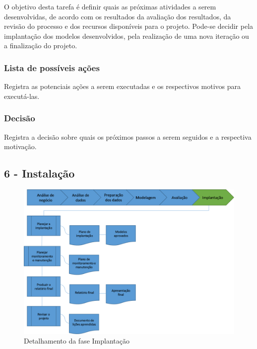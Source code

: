 O objetivo desta tarefa é definir quais as próximas atividades a serem desenvolvidas, de acordo com os resultados da avaliação dos resultados, da revisão do processo e dos recursos disponíveis para o projeto. Pode-se decidir pela implantação dos modelos desenvolvidos, pela realização de uma nova iteração ou a finalização do projeto.

\subsubsection*{Lista de possíveis ações}

Registra as potenciais ações a serem executadas e os respectivos motivos para executá-las.

\subsubsection*{Decisão}

Registra a decisão sobre quais os próximos passos a serem seguidos e a respectiva motivação.

\newpage 

\subsection*{6 - Instalação}


\begin{figure}[H]
	\includegraphics[scale=0.8]{img/CRISP-DM-Implantacao.png}
	\caption{Detalhamento da fase Implantação}
	\label{img:CRISP-DM-Implantação}
\end{figure}


